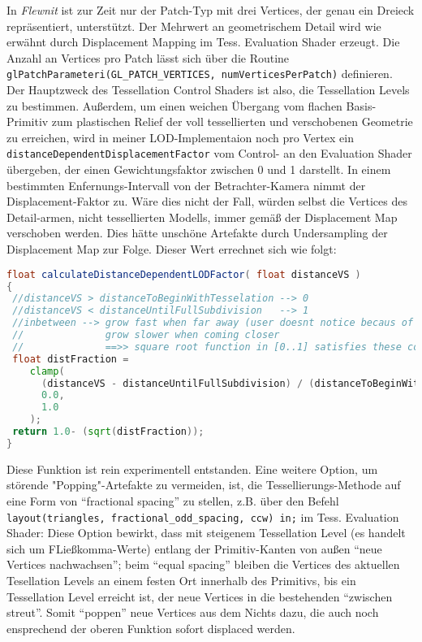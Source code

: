 	In \emph{Flewnit} ist zur Zeit nur der Patch-Typ mit drei Vertices, der genau ein Dreieck repräsentiert,
	unterstützt. Der Mehrwert an geometrischem Detail wird wie erwähnt durch Displacement Mapping
	im Tess. Evaluation Shader erzeugt. Die Anzahl an Vertices pro Patch lässt sich über die
	Routine \lstinline|glPatchParameteri(GL_PATCH_VERTICES, numVerticesPerPatch)| definieren.\\
	
	
	Der Hauptzweck des Tessellation Control Shaders ist also, die Tessellation Levels zu bestimmen.
	Außerdem, um einen weichen Übergang vom flachen Basis-Primitiv zum plastischen Relief der voll tessellierten
	und verschobenen Geometrie zu erreichen, wird in meiner LOD-Implementaion noch pro Vertex ein 
	\lstinline|distanceDependentDisplacementFactor| vom Control- an den Evaluation Shader übergeben, der einen 
	Gewichtungsfaktor zwischen 0 und 1 darstellt. In einem bestimmten Enfernungs-Intervall von der Betrachter-Kamera nimmt 
	der Displacement-Faktor zu. Wäre dies nicht der Fall, würden selbst die Vertices des Detail-armen, 
	nicht tessellierten Modells, immer gemäß der Displacement Map verschoben werden. Dies hätte 
	unschöne Artefakte durch Undersampling der Displacement Map zur Folge. 
	Dieser Wert errechnet sich wie folgt:
	\begin{lstlisting}[language=GLSL]
float calculateDistanceDependentLODFactor( float distanceVS )
{
 //distanceVS > distanceToBeginWithTesselation --> 0
 //distanceVS < distanceUntilFullSubdivision   --> 1
 //inbetween --> grow fast when far away (user doesnt notice becaus of distance), 
 //				 grow slower when coming closer
 //				 ==>> square root function in [0..1] satisfies these conditions
 float distFraction = 
    clamp(
      (distanceVS - distanceUntilFullSubdivision) / (distanceToBeginWithTesselation - distanceUntilFullSubdivision),
      0.0,
      1.0 
    );
 return 1.0- (sqrt(distFraction));
}
	\end{lstlisting}
	Diese Funktion ist rein experimentell entstanden. Eine weitere Option, um störende "Popping"-Artefakte
	zu vermeiden, ist, die Tessellierungs-Methode auf eine Form von "`fractional spacing"' zu stellen,
	z.B. über den Befehl \lstinline|layout(triangles, fractional_odd_spacing, ccw) in;| im Tess. Evaluation Shader:
	Diese Option bewirkt, dass mit steigenem Tessellation Level (es handelt sich um FLießkomma-Werte)
	entlang der Primitiv-Kanten von außen "`neue Vertices nachwachsen"'; beim "`equal spacing"' bleiben die
	Vertices des aktuellen Tesellation Levels an einem festen Ort innerhalb des Primitivs, bis ein
	Tessellation Level erreicht ist, der neue Vertices in die bestehenden "`zwischen streut"'. Somit
	"`poppen"' neue Vertices aus dem Nichts dazu, die auch noch ensprechend der oberen Funktion sofort displaced werden.\\
	
